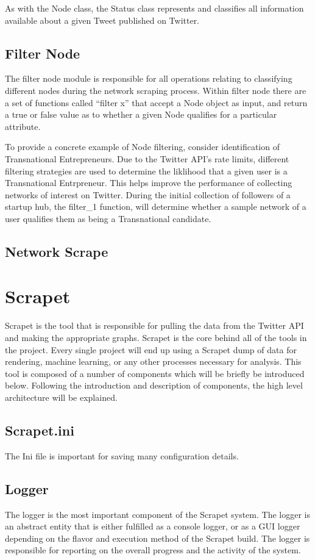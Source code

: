 As with the Node class, the Status class represents and classifies all
information available about a given Tweet published on Twitter.

\subsection{Filter Node}
The filter node module is responsible for all operations relating to
classifying different nodes during the network scraping process. Within
filter node there are a set of functions called ``filter x'' that accept
a Node object as input, and return a true or false value as to whether a
given Node qualifies for a particular attribute.

To provide a concrete example of Node filtering, consider identification
of Transnational Entrepreneurs. Due to the Twitter API's rate limits,
different filtering strategies are used to determine the liklihood that
a given user is a Transnational Entrpreneur. This helps improve the performance
of collecting networks of interest on Twitter. During the initial collection
of followers of a startup hub, the filter\_1 function, will determine whether
a sample network of a user qualifies them as being a Transnational candidate.

\subsection{Network Scrape}

\section{Scrapet}
Scrapet is the tool that is responsible for pulling the data from the
Twitter API and making the appropriate graphs. Scrapet is the core
behind all of the tools in the project. Every single project will end
up using a Scrapet dump of data for rendering, machine learning, or
any other processes necessary for analysis. This tool is composed of a
number of components which will be briefly be introduced
below. Following the introduction and description of components, the
high level architecture will be explained.

\subsection{Scrapet.ini}
The Ini file is important for saving many configuration details.

\subsection{Logger}
The logger is the most important component of the Scrapet system. The
logger is an abstract entity that is either fulfilled as a console
logger, or as a GUI logger depending on the flavor and execution
method of the Scrapet build. The logger is responsible for reporting
on the overall progress and the activity of the system.

